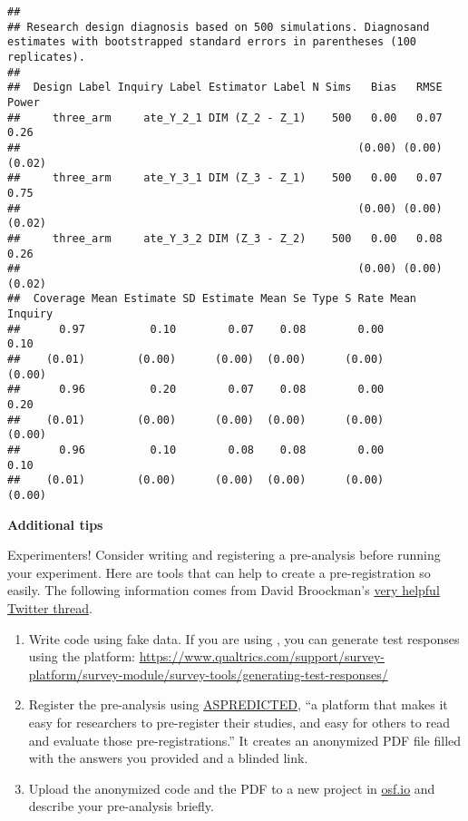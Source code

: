 \documentclass[
]{book}
\begin{document}
\begin{verbatim}
## 
## Research design diagnosis based on 500 simulations. Diagnosand estimates with bootstrapped standard errors in parentheses (100 replicates).
## 
##  Design Label Inquiry Label Estimator Label N Sims   Bias   RMSE  Power
##     three_arm     ate_Y_2_1 DIM (Z_2 - Z_1)    500   0.00   0.07   0.26
##                                                    (0.00) (0.00) (0.02)
##     three_arm     ate_Y_3_1 DIM (Z_3 - Z_1)    500   0.00   0.07   0.75
##                                                    (0.00) (0.00) (0.02)
##     three_arm     ate_Y_3_2 DIM (Z_3 - Z_2)    500   0.00   0.08   0.26
##                                                    (0.00) (0.00) (0.02)
##  Coverage Mean Estimate SD Estimate Mean Se Type S Rate Mean Inquiry
##      0.97          0.10        0.07    0.08        0.00         0.10
##    (0.01)        (0.00)      (0.00)  (0.00)      (0.00)       (0.00)
##      0.96          0.20        0.07    0.08        0.00         0.20
##    (0.01)        (0.00)      (0.00)  (0.00)      (0.00)       (0.00)
##      0.96          0.10        0.08    0.08        0.00         0.10
##    (0.01)        (0.00)      (0.00)  (0.00)      (0.00)       (0.00)
\end{verbatim}

\textbf{Additional tips}

Experimenters! Consider writing and registering a pre-analysis before running your experiment. Here are tools that can help to create a pre-registration so easily. The following information comes from David Broockman's \href{https://twitter.com/dbroockman/status/1350897814499336192}{very helpful Twitter thread}.

\begin{enumerate}
\def\labelenumi{\arabic{enumi}.}
\item
  Write code using fake data. If you are using , you can generate test responses using the platform: \url{https://www.qualtrics.com/support/survey-platform/survey-module/survey-tools/generating-test-responses/}
\item
  Register the pre-analysis using \href{https://aspredicted.org/}{ASPREDICTED}, ``a platform that makes it easy for researchers to pre-register their studies, and easy for others to read and evaluate those pre-registrations.'' It creates an anonymized PDF file filled with the answers you provided and a blinded link.
\item
  Upload the anonymized code and the PDF to a new project in \href{https://osf.io/}{osf.io} and describe your pre-analysis briefly.
\end{enumerate}
\end{document}
